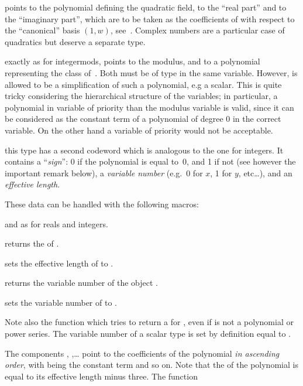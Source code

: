   points to the polynomial defining the
quadratic field,  to the ``real part'' and  to the
``imaginary part'', which are to be taken as the coefficients of 
with respect to the ``canonical'' basis $(1,w)$, see~.
Complex numbers are a particular case of quadratics but deserve a separate
type.

 exactly as
for integermods,  points to the modulus, and  to a
polynomial representing the class of~. Both must be of type
 in the same variable. However,  is allowed to be a
simplification of such a polynomial, e.g a scalar. This is quite tricky
considering the hierarchical structure of the variables; in particular, a
polynomial in variable of  priority than the modulus variable
is valid, since it can be considered as the constant term of a polynomial
of degree 0 in the correct variable. On the other hand a variable of
 priority would not be acceptable.

 this
type has a second codeword which is analogous to the one for integers. It
contains a ``{\it sign\/}'': 0 if the polynomial is equal to~0, and 1 if
not (see however the important remark below), a {\it variable number\/}
(e.g.~0 for $x$, 1 for $y$, etc\dots), and an {\it effective length}.

\noindent These data can be handled with the following macros:

 and  as for reals and integers.

 returns the  of .

 sets the effective length of  to
.

 returns the variable number of the object .

 sets the variable number of  to
.

Note also the function  which tries to return a
 for , even if  is not a polynomial or
power series. The variable number of a scalar type is set by definition
equal to .

The components , ,\dots {} point to the
coefficients of the polynomial {\it in ascending order}, with 
being the constant term and so on. Note that the {\it {}\/} of the
polynomial is equal to its effective length minus three. The function

